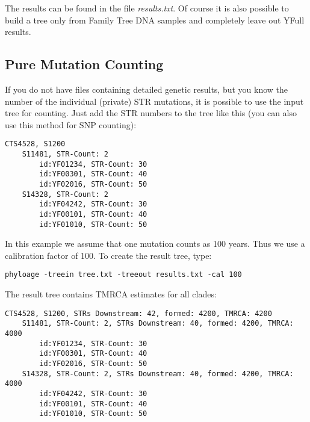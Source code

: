 The results can be found in the file \emph{results.txt}.
Of course it is also possible to build a tree only from
Family Tree DNA samples and completely leave out YFull
results.


\subsection{Pure Mutation Counting}

If you do not have files containing detailed genetic results,
but you know the number of the individual (private) STR
mutations, it is possible to use the input tree for counting.
Just add the STR numbers to the tree like this (you can also
use this method for SNP counting):

\begin{verbatim}
CTS4528, S1200
    S11481, STR-Count: 2
        id:YF01234, STR-Count: 30
        id:YF00301, STR-Count: 40
        id:YF02016, STR-Count: 50
    S14328, STR-Count: 2
        id:YF04242, STR-Count: 30
        id:YF00101, STR-Count: 40
        id:YF01010, STR-Count: 50
\end{verbatim}


In this example we assume that one mutation counts as 100
years. Thus we use a calibration factor of 100. To create
the result tree, type:

\vspace{1ex}\noindent
\texttt{phyloage -treein tree.txt -treeout results.txt -cal 100}
\vspace{1ex}

\noindent
The result tree contains TMRCA estimates for all clades:

\begin{verbatim}
CTS4528, S1200, STRs Downstream: 42, formed: 4200, TMRCA: 4200
    S11481, STR-Count: 2, STRs Downstream: 40, formed: 4200, TMRCA: 4000
        id:YF01234, STR-Count: 30
        id:YF00301, STR-Count: 40
        id:YF02016, STR-Count: 50
    S14328, STR-Count: 2, STRs Downstream: 40, formed: 4200, TMRCA: 4000
        id:YF04242, STR-Count: 30
        id:YF00101, STR-Count: 40
        id:YF01010, STR-Count: 50
\end{verbatim}






